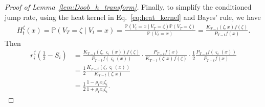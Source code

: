 \documentclass[11pt]{article}
\newcommand{\flip}{\varsigma}
\newcommand{\uV}{V}
\theoremstyle{named}
\theoremstyle{plain}
\newcommand{\Prob}{\ensuremath{{\mathbb{P}}}}
\newcommand{\parenth}[1]{\left( #1 \right)}
\begin{document}
\begin{proof}[Proof of Lemma~\ref{lem:Doob_h_transform}]
  Finally, to simplify the conditioned jump rate, using the heat kernel in Eq.~\eqref{eq:heat_kernel} and Bayes' rule, we have
  \begin{align*}
    H_t^{\zeta}(x) = \Prob(\uV_T = \zeta \mid \uV_t = x) = \frac{\Prob(\uV_t = x \mid \uV_T = \zeta) \Prob(\uV_T = \zeta)}{\Prob(\uV_t = x)} = \frac{K_{T-t}(\zeta, x) f(\zeta)}{P_{T-t} f(x)}.
  \end{align*}
  Then 
  \begin{align*}
    r_i^{\zeta} \parenth{\frac12 - S_i } &= \frac{K_{T-t}(\zeta, \flip_i(x)) f(\zeta) }{P_{T-t} f(\flip_i(x))} \cdot \frac{P_{T-t} f(x)}{K_{T-t}(\zeta, x) f(\zeta)} \cdot \frac12 \frac{P_{T-t} f(\flip_i(x))}{P_{T-t} f(x)}  \\
    &= \frac12 \frac{K_{T-t}(\zeta, \flip_i(x)) }{K_{T-t}(\zeta, x)} \\
    &= \frac12 \frac{1 - \rho_t x_i \zeta_i}{1 + \rho_t x_i \zeta_i}.
  \end{align*}

\end{proof}
\end{document}
